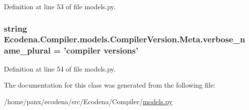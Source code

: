 Definition at line 53 of file models.py.

\hypertarget{class_ecodena_1_1_compiler_1_1models_1_1_compiler_version_1_1_meta_a41dfc813d5bc5fcfbfaf58b6aee9624a}{
\subsubsection[{verbose\_\-name\_\-plural}]{\setlength{\rightskip}{0pt plus 5cm}string {\bf Ecodena.Compiler.models.CompilerVersion.Meta.verbose\_\-name\_\-plural} = 'compiler versions'}}
\label{d7/d7b/class_ecodena_1_1_compiler_1_1models_1_1_compiler_version_1_1_meta_a41dfc813d5bc5fcfbfaf58b6aee9624a}


Definition at line 54 of file models.py.



The documentation for this class was generated from the following file:\begin{DoxyCompactItemize}
\item 
/home/panx/ecodena/src/Ecodena/Compiler/\hyperlink{_compiler_2models_8py}{models.py}\end{DoxyCompactItemize}
